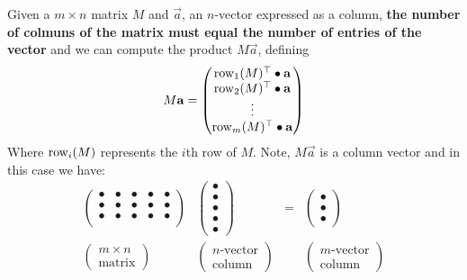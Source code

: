 \documentclass{ximera}
\begin{document}
Given a $m\times n$ matrix $M$ and $\vec{a}$, an $n$-vector expressed
as a column, \textbf{the number of colmuns of the matrix must equal
  the number of entries of the vector} and we can compute the product
$M\vec{a}$, defining
\[
  M \mathbf{a} =
  \begin{pmatrix}
    \operatorname{row}_1(M)^\top \bullet \mathbf{a} \\
    \operatorname{row}_2(M)^\top \bullet \mathbf{a} \\
    \vdots \\
    \operatorname{row}_m(M)^\top \bullet \mathbf{a}
  \end{pmatrix}
\]
Where $\operatorname{row}_i(M)$ represents the $i$th row of $M$. Note, $M\vec{a}$ is
a column vector and in this case we have:
\[
  \begin{matrix}
    \begin{pmatrix}
      \bullet & \bullet & \bullet & \bullet & \bullet \\
      \bullet & \bullet & \bullet & \bullet & \bullet \\
      \bullet & \bullet & \bullet & \bullet & \bullet \\
    \end{pmatrix}
    &
      \begin{pmatrix}
        \bullet \\ \bullet \\ \bullet \\ \bullet \\ \bullet
      \end{pmatrix}
    & = &
          \begin{pmatrix}
            \bullet \\ \bullet \\ \bullet
          \end{pmatrix}
    \\
    \begin{pmatrix}
      m\times n\\
      \text{matrix}
    \end{pmatrix}
    &
      \begin{pmatrix}
        n\text{-vector}\\
        \text{column}
      \end{pmatrix}
    & &
        \begin{pmatrix}
          m\text{-vector}\\
          \text{column}
        \end{pmatrix}
  \end{matrix}
\]
\end{document}
